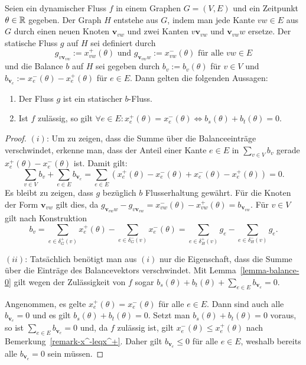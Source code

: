 \newcommand{\newv}{\mathbf{v}}
\begin{lemma}\label{lemma-b-graph}
	Seien ein dynamischer Fluss $f$ in einem Graphen $G=(V,E)$ und ein Zeitpunkt $\theta\in\mathbb{R}$ gegeben.
	Der Graph $H$ entstehe aus $G$, indem man jede Kante $vw\in E$ aus $G$ durch einen neuen Knoten $\newv_{vw}$ und zwei Kanten $v\newv_{vw}$ und $\newv_{vw}w$ ersetze.
	Der statische Fluss $g$ auf $H$ sei definiert durch
	\[ g_{v\newv_{vw}} := x_{vw}^+(\theta) \text{ und } g_{\newv_{vw}w} := x_{vw}^-(\theta) \text{ für alle $vw\in E$} \]
	und die Balance $b$ auf $H$ sei gegeben durch $b_v:= b_v(\theta)$ für $v\in V$ und $b_{\newv_e}:= x_e^-(\theta) - x_e^+(\theta)$ für $e\in E$.
	Dann gelten die folgenden Aussagen:
	
	\begin{enumerate}[label=(\roman*)]
		\item Der Fluss $g$ ist ein statischer $b$-Fluss.
		\item\label{lemma-b-graph-imp} Ist $f$ zulässig, so gilt $\forall e\in E : x_e^+(\theta) = x_e^-(\theta)\iff b_s(\theta) + b_t(\theta) = 0$.
	\end{enumerate}
\end{lemma} 
\begin{proof}
	$(i)$: Um zu zeigen, dass die Summe über die Balanceeinträge verschwindet, erkenne man, dass der Anteil einer Kante $e\in E$ in $\sum_{v\in V} b_v$ gerade $x_e^+(\theta) - x_e^-(\theta)$ ist.
	Damit gilt:
		\[ \sum_{v\in V}b_v + \sum_{e\in E} b_{\newv_e} = \sum_{e\in E}  (x_e^+(\theta) - x_e^-(\theta) + x_e^-(\theta) - x_e^+(\theta)) = 0. \]
		Es bleibt zu zeigen, dass $g$ bezüglich $b$ Flusserhaltung gewährt.
		Für die Knoten der Form $\newv_{vw}$ gilt dies, da $g_{\newv_{vw}w} - g_{v\newv_{vw}} = x_{vw}^-(\theta) - x_{vw}^+(\theta) = b_{\newv_{vw}}$.
		Für $v\in V$ gilt nach Konstruktion
		\[ b_v =
		\sum_{e\in\delta^+_G(v)} x_{e}^+(\theta) - \sum_{e\in\delta^-_G(v)} x_{e}^-(\theta) =
	\sum_{e\in\delta_H^+(v)} g_e - \sum_{e\in\delta^-_H(v)}g_e
		. \]
	
	$(ii)$: Tatsächlich benötigt man aus $(i)$ nur die Eigenschaft, dass die Summe über die Einträge des Balancevektors verschwindet.
	Mit Lemma~\ref{lemma-balance-0} gilt wegen der Zulässigkeit von $f$ sogar $b_s(\theta)+b_t(\theta) + \sum_{e\in E} b_{\newv_e} = 0$.
	
	Angenommen, es gelte $x_e^+(\theta) = x_e^-(\theta)$ für alle $e\in E$.
	Dann sind auch alle $b_{\newv_e} = 0$ und es gilt $b_s(\theta) + b_t(\theta) = 0$.
	Setzt man $b_s(\theta) + b_t(\theta) = 0$ voraus, so ist $\sum_{e\in E} b_{\newv_e} = 0$ und, da $f$ zulässig ist, gilt $x_e^-(\theta)\leq x_e^+(\theta)$ nach Bemerkung~\ref{remark-x^-leqx^+}.
	Daher gilt $b_{\newv_e}\leq 0$ für alle $e\in E$, weshalb bereits alle $b_{\newv_e} = 0$ sein müssen.
\end{proof}


